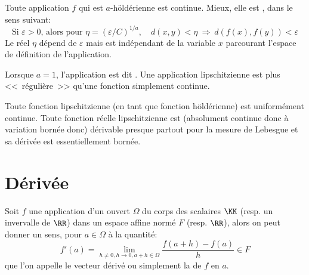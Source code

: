 \medskip
\begin{theoreme}
Toute application $f$ qui est $a$-höldérienne est continue. Mieux, elle est
, dans le sens suivant:
\begin{equation}
\text{Si } \varepsilon>0\text{, alors pour } \eta = \left( \varepsilon / C \right)^{1 / a},\quad d\left( x, y \right) < \eta  \ \Rightarrow\  d\left( f(x), f(y) \right) < \varepsilon
\end{equation}
Le réel $\eta$ dépend de $\varepsilon$ mais est indépendant de la variable $x$
parcourant l'espace de définition de l'application.
\end{theoreme}
\begin{definition}
Lorsque $a = 1$, l'application est dit .
Une application lipschitzienne est plus <<~régulière~>> qu'une fonction
simplement continue.
\end{definition}
\medskip
Toute fonction lipschitzienne (en tant que fonction höldérienne) est uniformément continue.
\medskip
Toute fonction réelle lipschitzienne est (absolument continue donc à variation bornée donc)
dérivable presque partout pour la mesure de Lebesgue et sa dérivée est essentiellement bornée.
\medskip
\section{Dérivée}
\medskip
\begin{definition}
Soit $f$ une application d'un ouvert $\Omega$ du corps des scalaires $\KK$ (resp. un invervalle
de $\RR$) dans un espace affine normé $F$ (resp. $\RR$), alors on peut donner un sens,
pour $a\in\Omega$ à la quantité:
\begin{equation}
f'(a)=\lim_{h\ne0, h\to0, a+h\in\Omega} \dfrac{f(a+h)-f(a)}h \in F
\end{equation}
que l'on appelle le vecteur dérivé ou simplement la  de
$f$ en $a$.
\end{definition}

